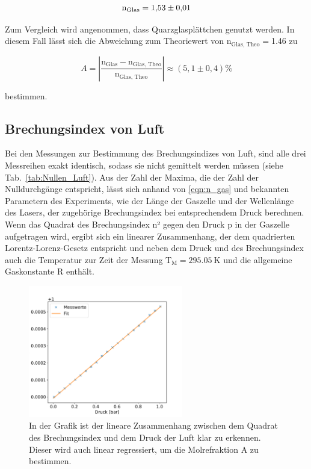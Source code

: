         \begin{equation}
            \text{n}_{\text{Glas}} = \num{1.53 +- 0.01}
        \end{equation}

        Zum Vergleich wird angenommen, dass Quarzglasplättchen genutzt werden. In diesem Fall lässt sich die Abweichung zum Theoriewert von $\text{n}_{\text{Glas, Theo}}=$\num{1.46}\cite{theeten_new_1978} zu

        \begin{equation*}
            A= \left|\frac{\text{n}_{\text{Glas}} - \text{n}_{\text{Glas, Theo}}}{\text{n}_{\text{Glas, Theo}}}\right| \approx (5,1 \pm 0,4) \%
        \end{equation*}

        bestimmen.


    \subsection{Brechungsindex von Luft}
        Bei den Messungen zur Bestimmung des Brechungsindizes von Luft, sind alle drei Messreihen exakt identisch, sodass sie nicht gemittelt werden müssen (siehe Tab.~\ref{tab:Nullen_Luft}). Aus der Zahl der Maxima, die der Zahl der 
        Nulldurchgänge entspricht, lässt sich anhand von \eqref{eqn:n_gas} und bekannten Parametern des Experiments, wie der Länge der Gaszelle und der Wellenlänge des Lasers, der zugehörige Brechungsindex
        bei entsprechendem Druck berechnen. Wenn das Quadrat des Brechungsindex n² gegen den Druck p in der Gaszelle aufgetragen wird, ergibt sich ein linearer Zusammenhang, der dem quadrierten Lorentz-Lorenz-Gesetz entspricht und neben dem Druck und des Brechungsindex auch die Temperatur zur Zeit der Messung $\text{T}_{\text{M}}=\SI{295.05}{\kelvin}$ und die allgemeine Gaskonstante R enthält. 


        \FloatBarrier

        \begin{figure}[h]
          \centering
          \includegraphics[width = 0.6\textwidth]{pictures/n_quad_fit.pdf}
          \caption{In der Grafik ist der lineare Zusammenhang zwischen dem Quadrat des Brechungsindex und dem Druck der Luft klar zu erkennen. Dieser wird auch linear regressiert, um die Molrefraktion A zu bestimmen.}
          \label{fig:n_quad_fit}
        \end{figure}

